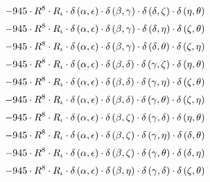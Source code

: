 \begin{subequations}
\begin{gather}
 \\[0.2em] \notag 		 - 945 \cdot R^{8} \cdot R_{\iota{}} \cdot \delta{}\left(\alpha{}, \epsilon{}\right) \cdot \delta{}\left(\beta{}, \gamma{}\right) \cdot \delta{}\left(\delta{}, \zeta{}\right) \cdot \delta{}\left(\eta{}, \theta{}\right) 
 \\[0.2em] \notag 		 - 945 \cdot R^{8} \cdot R_{\iota{}} \cdot \delta{}\left(\alpha{}, \epsilon{}\right) \cdot \delta{}\left(\beta{}, \gamma{}\right) \cdot \delta{}\left(\delta{}, \eta{}\right) \cdot \delta{}\left(\zeta{}, \theta{}\right) 
 \\[0.2em] \notag 		 - 945 \cdot R^{8} \cdot R_{\iota{}} \cdot \delta{}\left(\alpha{}, \epsilon{}\right) \cdot \delta{}\left(\beta{}, \gamma{}\right) \cdot \delta{}\left(\delta{}, \theta{}\right) \cdot \delta{}\left(\zeta{}, \eta{}\right) 
 \\[0.2em] \notag 		 - 945 \cdot R^{8} \cdot R_{\iota{}} \cdot \delta{}\left(\alpha{}, \epsilon{}\right) \cdot \delta{}\left(\beta{}, \delta{}\right) \cdot \delta{}\left(\gamma{}, \zeta{}\right) \cdot \delta{}\left(\eta{}, \theta{}\right) 
 \\[0.2em] \notag 		 - 945 \cdot R^{8} \cdot R_{\iota{}} \cdot \delta{}\left(\alpha{}, \epsilon{}\right) \cdot \delta{}\left(\beta{}, \delta{}\right) \cdot \delta{}\left(\gamma{}, \eta{}\right) \cdot \delta{}\left(\zeta{}, \theta{}\right) 
 \\[0.2em] \notag 		 - 945 \cdot R^{8} \cdot R_{\iota{}} \cdot \delta{}\left(\alpha{}, \epsilon{}\right) \cdot \delta{}\left(\beta{}, \delta{}\right) \cdot \delta{}\left(\gamma{}, \theta{}\right) \cdot \delta{}\left(\zeta{}, \eta{}\right) 
 \\[0.2em] \notag 		 - 945 \cdot R^{8} \cdot R_{\iota{}} \cdot \delta{}\left(\alpha{}, \epsilon{}\right) \cdot \delta{}\left(\beta{}, \zeta{}\right) \cdot \delta{}\left(\gamma{}, \delta{}\right) \cdot \delta{}\left(\eta{}, \theta{}\right) 
 \\[0.2em] \notag 		 - 945 \cdot R^{8} \cdot R_{\iota{}} \cdot \delta{}\left(\alpha{}, \epsilon{}\right) \cdot \delta{}\left(\beta{}, \zeta{}\right) \cdot \delta{}\left(\gamma{}, \eta{}\right) \cdot \delta{}\left(\delta{}, \theta{}\right) 
 \\[0.2em] \notag 		 - 945 \cdot R^{8} \cdot R_{\iota{}} \cdot \delta{}\left(\alpha{}, \epsilon{}\right) \cdot \delta{}\left(\beta{}, \zeta{}\right) \cdot \delta{}\left(\gamma{}, \theta{}\right) \cdot \delta{}\left(\delta{}, \eta{}\right) 
 \\[0.2em] \notag 		 - 945 \cdot R^{8} \cdot R_{\iota{}} \cdot \delta{}\left(\alpha{}, \epsilon{}\right) \cdot \delta{}\left(\beta{}, \eta{}\right) \cdot \delta{}\left(\gamma{}, \delta{}\right) \cdot \delta{}\left(\zeta{}, \theta{}\right) 

\end{gather}
\end{subequations}
